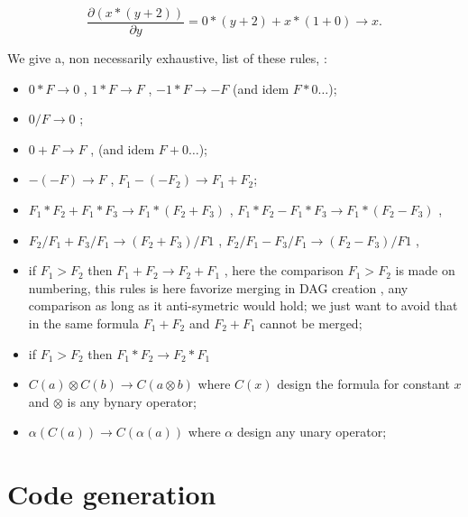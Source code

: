\begin{equation}
	\frac{\partial(x*(y+2))}{\partial y}
	=  0 * (y+2) + x * (1 + 0)
	\rightarrow x
	\label{Form:Reduc}.
\end{equation}

We give a, non necessarily exhaustive, list of these rules, :

\begin{itemize}
     \item  $0*F \rightarrow 0$ ,   $1*F  \rightarrow F$ , $-1*F \rightarrow -F$ (and idem $F*0\dots$);

     \item  $0/F \rightarrow 0$ ;

     \item  $0+F \rightarrow F$ ,   (and idem $F+0\dots$);

     \item  $-(-F) \rightarrow F$ ,  $F_1-(-F_2) \rightarrow F_1+F_2$;

     \item  $F_1*F_2 + F_1*F_3  \rightarrow F_1*(F_2+F_3)$ , $F_1*F_2 - F_1*F_3  \rightarrow F_1*(F_2-F_3)$ , 
     \item  $F_2/F_1 + F_3/F_1  \rightarrow (F_2+F_3)/F1$ ,  $F_2/F_1 - F_3/F_1  \rightarrow (F_2-F_3)/F1$ , 

     \item if  $F_1 > F_2$ then  $F_1 + F_2  \rightarrow F_2 + F_1$ , here the comparison $F_1 > F_2$ 
           is made on numbering, this rules is here favorize merging in DAG creation , any comparison as long
           as it anti-symetric would hold; we just want to avoid that in the same formula $F_1+F_2$ and $F_2+F_1$
	   cannot be merged;
     \item if  $F_1 > F_2$ then  $F_1 * F_2  \rightarrow F_2 * F_1$ 

     \item  $C(a) \otimes C(b) \rightarrow C(a \otimes b) $  where  $C(x)$ design the formula for constant $x$
	     and $\otimes$ is any bynary operator;
     \item  $ \alpha (C(a)) \rightarrow C(\alpha (a)) $  where  $\alpha$ design any unary operator;

\end{itemize}



\section{Code generation}


